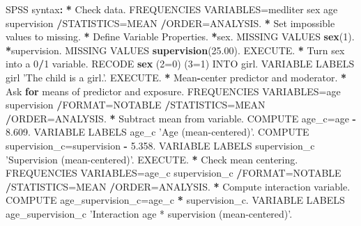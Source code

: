 \documentclass[a4paper]{book}
\newenvironment{Shaded}{\begin{snugshade}}{\end{snugshade}}
\newcommand{\KeywordTok}[1]{\textcolor[rgb]{0,0,0}{\textbf{#1}}}
\newcommand{\DecValTok}[1]{\textcolor[rgb]{0.00,0.00,0.00}{#1}}
\newcommand{\FloatTok}[1]{\textcolor[rgb]{0.00,0.00,0.00}{#1}}
\newcommand{\StringTok}[1]{\textcolor[rgb]{0.00,0.00,0.00}{#1}}
\newcommand{\ControlFlowTok}[1]{\textcolor[rgb]{0.00,0.00,0.00}{\textbf{#1}}}
\newcommand{\OperatorTok}[1]{\textcolor[rgb]{0.00,0.00,0.00}{\textbf{#1}}}
\newcommand{\ErrorTok}[1]{\textcolor[rgb]{0.00,0.00,0.00}{\textbf{#1}}}
\newcommand{\NormalTok}[1]{#1}
\theoremstyle{definition}
\theoremstyle{definition}
\theoremstyle{definition}
\theoremstyle{remark}
\begin{document}
\begin{Shaded}
\begin{Highlighting}[]
\NormalTok{SPSS syntax}\OperatorTok{:}\StringTok{  }
\StringTok{    }
\ErrorTok{*}\StringTok{ }\NormalTok{Check data.  }
\NormalTok{FREQUENCIES VARIABLES=medliter sex age supervision  }
  \OperatorTok{/}\NormalTok{STATISTICS=MEAN  }
  \OperatorTok{/}\NormalTok{ORDER=ANALYSIS.  }
\OperatorTok{*}\StringTok{ }\NormalTok{Set impossible values to missing.  }
\OperatorTok{*}\StringTok{ }\NormalTok{Define Variable Properties.  }
\OperatorTok{*}\NormalTok{sex.  }
\NormalTok{MISSING VALUES }\KeywordTok{sex}\NormalTok{(}\DecValTok{1}\NormalTok{).  }
\OperatorTok{*}\NormalTok{supervision.  }
\NormalTok{MISSING VALUES }\KeywordTok{supervision}\NormalTok{(}\FloatTok{25.00}\NormalTok{).  }
\NormalTok{EXECUTE.  }
\OperatorTok{*}\StringTok{ }\NormalTok{Turn sex into a }\DecValTok{0}\OperatorTok{/}\DecValTok{1}\NormalTok{ variable.  }
\NormalTok{RECODE }\KeywordTok{sex}\NormalTok{ (}\DecValTok{2}\NormalTok{=}\DecValTok{0}\NormalTok{) (}\DecValTok{3}\NormalTok{=}\DecValTok{1}\NormalTok{) INTO girl.  }
\NormalTok{VARIABLE LABELS  girl }\StringTok{'The child is a girl.'}\NormalTok{.  }
\NormalTok{EXECUTE.  }
\OperatorTok{*}\StringTok{ }\NormalTok{Mean}\OperatorTok{-}\NormalTok{center predictor and moderator.  }
\OperatorTok{*}\StringTok{ }\NormalTok{Ask }\ControlFlowTok{for}\NormalTok{ means of predictor and exposure.  }
\NormalTok{FREQUENCIES VARIABLES=age supervision  }
  \OperatorTok{/}\NormalTok{FORMAT=NOTABLE  }
  \OperatorTok{/}\NormalTok{STATISTICS=MEAN  }
  \OperatorTok{/}\NormalTok{ORDER=ANALYSIS.  }
\OperatorTok{*}\StringTok{ }\NormalTok{Subtract mean from variable.  }
\NormalTok{COMPUTE age_c=age }\OperatorTok{-}\StringTok{ }\FloatTok{8.609}\NormalTok{.  }
\NormalTok{VARIABLE LABELS  age_c }\StringTok{'Age (mean-centered)'}\NormalTok{.  }
\NormalTok{COMPUTE supervision_c=supervision }\OperatorTok{-}\StringTok{ }\FloatTok{5.358}\NormalTok{.  }
\NormalTok{VARIABLE LABELS  supervision_c }\StringTok{'Supervision (mean-centered)'}\NormalTok{.  }
\NormalTok{EXECUTE.  }
\OperatorTok{*}\StringTok{ }\NormalTok{Check mean centering.  }
\NormalTok{FREQUENCIES VARIABLES=age_c supervision_c  }
  \OperatorTok{/}\NormalTok{FORMAT=NOTABLE  }
  \OperatorTok{/}\NormalTok{STATISTICS=MEAN  }
  \OperatorTok{/}\NormalTok{ORDER=ANALYSIS.  }
\OperatorTok{*}\StringTok{ }\NormalTok{Compute interaction variable.  }
\NormalTok{COMPUTE age_supervision_c=age_c }\OperatorTok{*}\StringTok{ }\NormalTok{supervision_c.  }
\NormalTok{VARIABLE LABELS  age_supervision_c }\StringTok{'Interaction age * supervision (mean-centered)'}\NormalTok{.  }

\end{Highlighting}
\end{Shaded}
\end{document}
